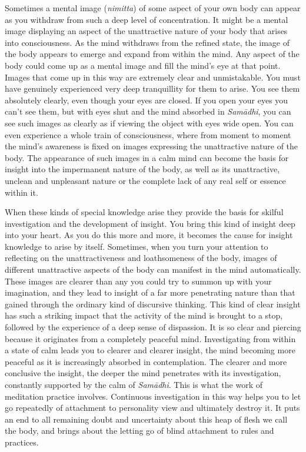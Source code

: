 Sometimes a mental image (\textit{nimitta}) of some aspect of your own body can appear as you withdraw from such a deep level of concentration. It might be a mental image displaying an aspect of the unattractive nature of your body that arises into consciousness. As the mind withdraws from the refined state, the image of the body appears to emerge and expand from within the mind. Any aspect of the body could come up as a mental image and fill the mind's eye at that point. Images that come up in this way are extremely clear and unmistakable. You must have genuinely experienced very deep tranquillity for them to arise. You see them absolutely clearly, even though your eyes are closed. If you open your eyes you can't see them, but with eyes shut and the mind absorbed in \textit{Sam\=adhi}, you can see such images as clearly as if viewing the object with eyes wide open. You can even experience a whole train of consciousness, where from moment to moment the mind's awareness is fixed on images expressing the unattractive nature of the body. The appearance of such images in a calm mind can become the basis for insight into the impermanent nature of the body, as well as its unattractive, unclean and unpleasant nature or the complete lack of any real self or essence within it.

When these kinds of special knowledge arise they provide the basis for skilful investigation and the development of insight. You bring this kind of insight deep into your heart. As you do this more and more, it becomes the cause for insight knowledge to arise by itself. Sometimes, when you turn your attention to reflecting on the unattractiveness and loathsomeness of the body, images of different unattractive aspects of the body can manifest in the mind automatically. These images are clearer than any you could try to summon up with your imagination, and they lead to insight of a far more penetrating nature than that gained through the ordinary kind of discursive thinking. This kind of clear insight has such a striking impact that the activity of the mind is brought to a stop, followed by the experience of a deep sense of dispassion. It is so clear and piercing because it originates from a completely peaceful mind. Investigating from within a state of calm leads you to clearer and clearer insight, the mind becoming more peaceful as it is increasingly absorbed in contemplation. The clearer and more conclusive the insight, the deeper the mind penetrates with its investigation, constantly supported by the calm of \textit{Sam\=adhi}. This is what the work of meditation practice involves. Continuous investigation in this way helps you to let go repeatedly of attachment to personality view and ultimately destroy it. It puts an end to all remaining doubt and uncertainty about this heap of flesh we call the body, and brings about the letting go of blind attachment to rules and practices.

